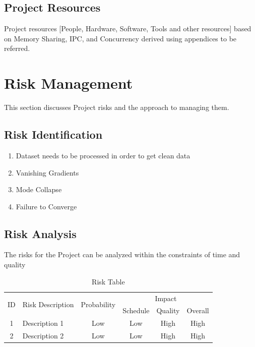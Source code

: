 \documentclass[oneside,a4paper,12pt]{report}
\begin{document}
\begin{table}[!htbp]
\subsection{Project Resources}
          Project resources  [People, Hardware, Software, Tools and other resources] based on Memory Sharing, IPC, and Concurrency derived using appendices to be referred.

\section{Risk Management }
This section discusses Project risks and the approach to managing them.
\subsection{Risk Identification}
\begin{enumerate}
  \item Dataset needs to be processed in order to get clean data
  \item Vanishing Gradients
  \item Mode Collapse
  \item Failure to Converge
\end{enumerate}

\subsection{Risk Analysis}
The risks for the Project can be analyzed within the constraints of time and quality

\begin{table}[!htbp]
\begin{center}
\def\arraystretch{1.5}
\begin{tabularx}{\textwidth}{| c | X | c | c | c | c |}
\hline
\multirow{2}{*}{ID} & \multirow{2}{*}{Risk Description}	& \multirow{2}{*}{Probability} & \multicolumn{3}{|c|}{Impact} \\ \cline{4-6}
	& & &	Schedule	& Quality	& Overall \\ \hline
1	& Description 1	& Low	& Low	& High	& High \\ \hline
2	& Description 2	& Low	& Low	& High	& High \\ \hline
\end{tabularx}
\end{center}
\caption{Risk Table}
\label{tab:risk}
\end{table}



\end{table}
\end{document}
